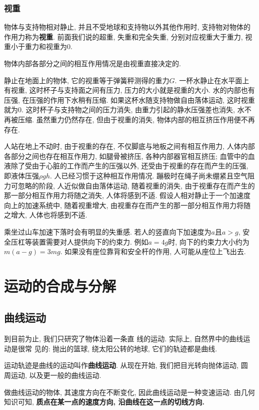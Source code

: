 \documentclass[11pt,a4paper]{ctexbook}
\begin{document}
\subsection*{视重}
物体与支持物相对静止, 并且不受地球和支持物以外其他作用时, 支持物对物体的作用力称为\textbf{视重}.
前面我们说的超重, 失重和完全失重, 分别对应视重大于重力, 视重小于重力和视重为0.

物体内部各部分之间的相互作用情况是由视重直接决定的.

静止在地面上的物体, 它的视重等于弹簧秤测得的重力$G$.
一杯水静止在水平面上有视重, 这时杯子与支持面之间有压力,
压力的大小就是视重的大小. 水的内部也有压强, 在压强的作用下水稍有压缩.
如果这杯水随支持物做自由落体运动, 这时视重就为0. 这时杯子与支持物之间的压力消失,
由重力引起的静水压强差也消失, 水不再被压缩. 虽然重力仍然存在, 但由于视重的消失, 物体内部的相互挤压作用便不再存在.

人站在地上不动时, 由于视重的存在, 不仅脚底与地板之间有相互作用力, 人体内部各部分之间也存在相互作用力,
如腿骨被挤压, 各种内部器官相互挤压; 血管中的血液除了受由于心脏的工作而产生的压强以外,
还受由于视重的存在而产生的压强, 即液体压强$\rho gh$.
人已经习惯于这种相互作用情况.
蹦极时在绳子尚未绷紧且空气阻力可忽略的阶段, 人近似做自由落体运动, 随着视重的消失, 由于视重存在而产生的那一部分相互作用力将随之消失,
人体将感到不适. 假设人相对静止于一个加速度向上的加速系统中, 随着视重增大,
由视重存在而产生的那一部分相互作用力将随之增大, 人体也将感到不适.

乘坐过山车加速下落时会有明显的失重感. 若人的竖直向下加速度为$a$且$a>g$, 安全压杠等装置需要对人提供向下的约束力.
例如$a=4g$时, 向下的约束力大小约为$m(a-g)=3mg$. 如果没有座位靠背和安全杆的作用, 人可能从座位上飞出去.

\chapter{运动的合成与分解}

\section{曲线运动}

到目前为止, 我们只研究了物体沿着一条直
线的运动. 实际上, 自然界中的曲线运动是很常
见的: 抛出的篮球, 绕太阳公转的地球, 它们的轨迹都是曲线.

运动轨迹是曲线的运动叫作\textbf{曲线运动}. 从现在开始, 我们把目光转向抛体运动, 圆
周运动, 以及更一般的曲线运动.

做曲线运动的物体, 其速度方向在不断变化, 因此曲线运动是一种变速运动.
由几何知识可知, \textbf{质点在某一点的速度方向, 沿曲线在这一点的切线方向.}
\end{document}
